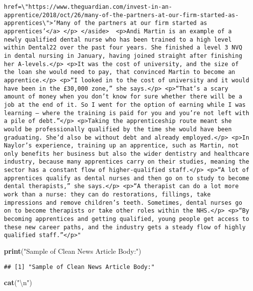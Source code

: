 \documentclass[]{article}
\newenvironment{Shaded}{\begin{snugshade}}{\end{snugshade}}
\newcommand{\KeywordTok}[1]{\textcolor[rgb]{0.13,0.29,0.53}{\textbf{#1}}}
\newcommand{\CharTok}[1]{\textcolor[rgb]{0.31,0.60,0.02}{#1}}
\newcommand{\StringTok}[1]{\textcolor[rgb]{0.31,0.60,0.02}{#1}}
\newcommand{\NormalTok}[1]{#1}
\begin{document}
\begin{verbatim}
href=\"https://www.theguardian.com/invest-in-an-apprentice/2018/oct/26/many-of-the-partners-at-our-firm-started-as-apprentices\">‘Many of the partners at our firm started as apprentices’</a> </p> </aside>  <p>Andi Martin is an example of a newly qualified dental nurse who has been trained to a high level within Dental22 over the past four years. She finished a level 3 NVQ in dental nursing in January, having joined straight after finishing her A-levels.</p> <p>It was the cost of university, and the size of the loan she would need to pay, that convinced Martin to become an apprentice.</p> <p>“I looked in to the cost of university and it would have been in the £30,000 zone,” she says.</p> <p>“That’s a scary amount of money when you don’t know for sure whether there will be a job at the end of it. So I went for the option of earning while I was learning – where the training is paid for you and you’re not left with a pile of debt.”</p> <p>Taking the apprenticeship route meant she would be professionally qualified by the time she would have been graduating. She’d also be without debt and already employed.</p> <p>In Naylor’s experience, training up an apprentice, such as Martin, not only benefits her business but also the wider dentistry and healthcare industry, because many apprentices carry on their studies, meaning the sector has a constant flow of higher-qualified staff.</p> <p>“A lot of apprentices qualify as dental nurses and then go on to study to become dental therapists,” she says.</p> <p>“A therapist can do a lot more work than a nurse: they can do restorations, fillings, take impressions and remove children’s teeth. Sometimes, dental nurses go on to become therapists or take other roles within the NHS.</p> <p>“By becoming apprentices and getting qualified, young people get access to these new career paths, and the industry gets a steady flow of highly qualified staff.”</p>"
\end{verbatim}

\begin{Shaded}
\begin{Highlighting}[]
\KeywordTok{print}\NormalTok{(}\StringTok{"Sample of Clean News Article Body:"}\NormalTok{)}
\end{Highlighting}
\end{Shaded}

\begin{verbatim}
## [1] "Sample of Clean News Article Body:"
\end{verbatim}

\begin{Shaded}
\begin{Highlighting}[]
\KeywordTok{cat}\NormalTok{(}\StringTok{"}\CharTok{\textbackslash{}n}\StringTok{"}\NormalTok{)}
\end{Highlighting}
\end{Shaded}
\end{document}
